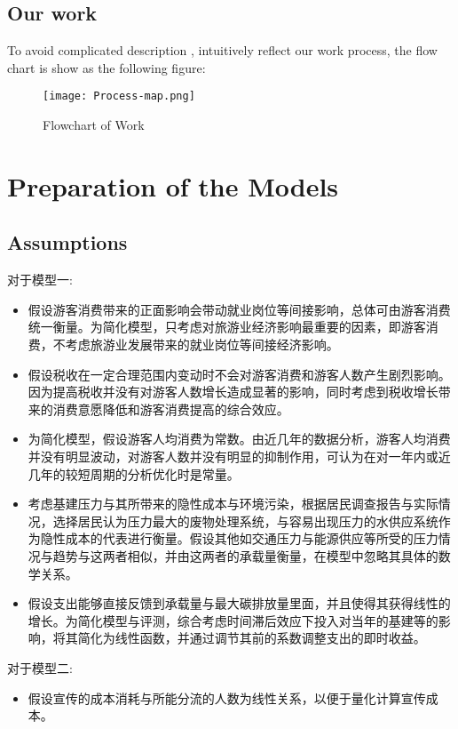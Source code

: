 \documentclass[12pt]{article}  %
\begin{document}
\subsection{Our work}
To avoid complicated description , intuitively reflect our work process, the flow chart is show
as the following figure:
\begin{figure}[H]
	\centering
	\texttt{[image: Process-map.png]}
	\caption{Flowchart of Work}\label{fig:Process-map}
\end{figure}

\section{Preparation of the Models}
\subsection{Assumptions}
对于模型一:
\begin{itemize}
	\item 假设游客消费带来的正面影响会带动就业岗位等间接影响，总体可由游客消费统一衡量。为简化模型，只考虑对旅游业经济影响最重要的因素，即游客消费，不考虑旅游业发展带来的就业岗位等间接经济影响。
	\item 假设税收在一定合理范围内变动时不会对游客消费和游客人数产生剧烈影响。因为提高税收并没有对游客人数增长造成显著的影响，同时考虑到税收增长带来的消费意愿降低和游客消费提高的综合效应。
	\item 为简化模型，假设游客人均消费为常数。由近几年的数据分析，游客人均消费并没有明显波动，对游客人数并没有明显的抑制作用，可认为在对一年内或近几年的较短周期的分析优化时是常量。
	\item 考虑基建压力与其所带来的隐性成本与环境污染，根据居民调查报告与实际情况，选择居民认为压力最大的废物处理系统，与容易出现压力的水供应系统作为隐性成本的代表进行衡量。假设其他如交通压力与能源供应等所受的压力情况与趋势与这两者相似，并由这两者的承载量衡量，在模型中忽略其具体的数学关系。
	\item 假设支出能够直接反馈到承载量与最大碳排放量里面，并且使得其获得线性的增长。为简化模型与评测，综合考虑时间滞后效应下投入对当年的基建等的影响，将其简化为线性函数，并通过调节其前的系数调整支出的即时收益。
\end{itemize}
对于模型二:
\begin{itemize}
	\item 假设宣传的成本消耗与所能分流的人数为线性关系，以便于量化计算宣传成本。
\end{itemize}
\end{document}
